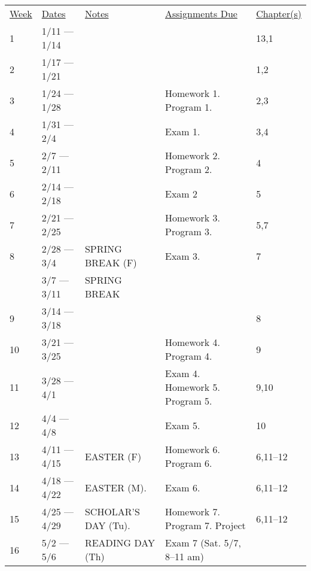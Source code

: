 \documentclass[10pt]{article}
\begin{document}
\begin{center}
\begin{tabular}{lllll}
\underline{Week} & \underline{Dates} & \underline{Notes} & \underline{Assignments Due} & \underline{Chapter(s)}\\
1 & 1/11 --- 1/14 & & & 13,1   \\
2 & 1/17 --- 1/21 & & & 1,2 \\
3 & 1/24 --- 1/28 & & Homework 1. Program 1. & 2,3 \\
4 & 1/31 --- 2/4 & & Exam 1. & 3,4 \\
5 & 2/7 --- 2/11 & &  Homework 2. Program 2. & 4 \\
6 & 2/14 --- 2/18 & & Exam 2 & 5 \\
7 & 2/21 --- 2/25 & & Homework 3. Program 3. & 5,7 \\
8 & 2/28 --- 3/4 &  SPRING BREAK (F) & Exam 3. & 7  \\
& 3/7 --- 3/11 &  SPRING BREAK & \\
9 & 3/14 --- 3/18 & & & 8 \\
10 & 3/21 --- 3/25 & & Homework 4. Program 4. & 9 \\
11 & 3/28 --- 4/1 & & Exam 4. Homework 5. Program 5. & 9,10\\
12 & 4/4 --- 4/8 &  & Exam 5. &  10\\
13 & 4/11 --- 4/15 & EASTER (F) & Homework 6. Program 6. &  6,11--12\\
14 & 4/18 --- 4/22 & EASTER (M). & Exam 6. & 6,11--12\\
15 & 4/25 --- 4/29 & SCHOLAR'S DAY (Tu). & Homework 7. Program 7. Project &  6,11--12\\
16 & 5/2 --- 5/6 & READING DAY (Th) & Exam 7 (Sat. 5/7, 8--11 am) &
\end{tabular}
\end{center}
\end{document}
